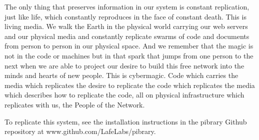 The only thing that preserves information in our system is constant
replication, just like life, which constantly reproduces in the face of
constant death. This is living media. We walk the Earth in the physical
world carrying our web servers and our physical media and constantly
replicate swarms of code and documents from person to person in our
physical space. And we remember that the magic is not in the code or
machines but in that spark that jumps from one person to the next when
we are able to project our desire to build this free network into the
minds and hearts of new people. This is cybermagic. Code which carries
the media which replicates the desire to replicate the code which
replicates the media which describes how to replicate the code, all on
physical infrastructure which replicates with us, the People of the
Network.

To replicate this system, see the installation instructions in the
pibrary Github repository at www.github.com/LafeLabs/pibrary.
